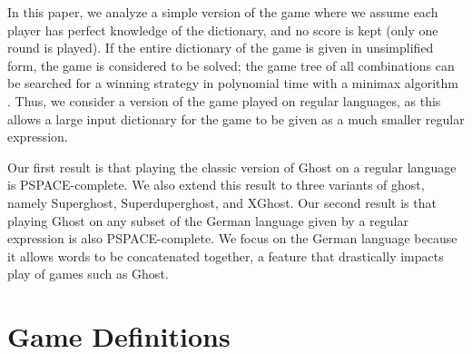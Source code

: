 \documentclass[runningheads,a4paper]{llncs}
\begin{document}
	In this paper, we analyze a simple version of the game where we assume each player has perfect knowledge of the dictionary, and no score is kept (only one round is played). If the entire dictionary of the game is given in unsimplified form, the game is considered to be solved; the game tree of all combinations can be searched for a winning strategy in polynomial time with a minimax algorithm \cite{ghostbusters}\cite{randall}. Thus, we consider a version of the game played on regular languages, as this allows a large input dictionary for the game to be given as a much smaller regular expression.

%


	Our first result is that playing the classic version of Ghost on a regular language is PSPACE-complete. We also extend this result to three variants of ghost, namely Superghost, Superduperghost, and XGhost. Our second result is that playing Ghost on any subset of the German language given by a regular expression is also PSPACE-complete. We focus on the German language because it allows words to be concatenated together, a feature that drastically impacts play of games such as Ghost.

%
%

\section{Game Definitions}
\label{Game Definitions}
\end{document}
